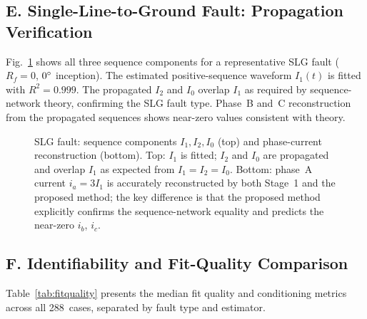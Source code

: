 \documentclass[10pt,journal,twoside]{IEEEtran}
\begin{document}
\subsection{E. Single-Line-to-Ground Fault: Propagation Verification}
\label{sec:results:slg}

Fig.~\ref{fig:slg_waveforms} shows all three sequence components for a
representative SLG fault ($R_f = 0$, $0\degree$ inception).
The estimated positive-sequence waveform $I_1(t)$ is fitted with
$R^2 = 0.999$.  The propagated $I_2$ and $I_0$ overlap $I_1$ as
required by sequence-network theory, confirming the SLG fault type.
Phase~B and~C reconstruction from the propagated sequences shows
near-zero values consistent with theory.

\begin{figure}[!t]
\centering

\caption{SLG fault: sequence components $I_1, I_2, I_0$ (top) and
  phase-current reconstruction (bottom).
  Top: $I_1$ is fitted; $I_2$ and $I_0$ are propagated and overlap
  $I_1$ as expected from $I_1=I_2=I_0$.
  Bottom: phase~A current $i_a = 3I_1$ is accurately reconstructed
  by both Stage~1 and the proposed method; the key difference is that
  the proposed method explicitly confirms the sequence-network equality
  and predicts the near-zero $i_b$, $i_c$.}
\label{fig:slg_waveforms}
\end{figure}

\subsection{F. Identifiability and Fit-Quality Comparison}
\label{sec:results:fitquality}

Table~\ref{tab:fitquality} presents the median fit quality and conditioning
metrics across all 288~cases, separated by fault type and estimator.
\end{document}
